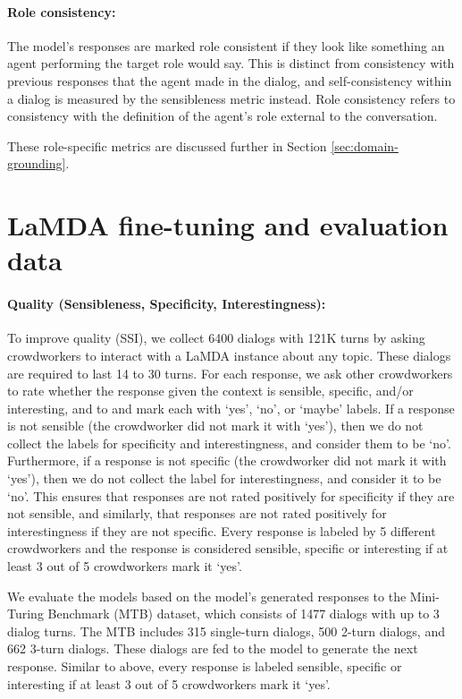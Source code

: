 \paragraph{Role consistency:} The model’s responses are marked role consistent if they look like something an agent performing the target role would say. This is distinct from consistency with previous responses that the agent made in the dialog, and self-consistency within a dialog is measured by the sensibleness metric instead. Role consistency refers to consistency with the definition of the agent’s role external to the conversation.

These role-specific metrics are discussed further in Section \ref{sec:domain-grounding}.

\section{LaMDA fine-tuning and evaluation data}
\label{sec:data}

\paragraph{Quality (Sensibleness, Specificity, Interestingness):} To improve quality (SSI), we collect 6400 dialogs with 121K turns by asking crowdworkers to interact with a LaMDA instance about any topic. These dialogs are required to last 14 to 30 turns. For each response, we ask other crowdworkers to rate whether the response given the context is sensible, specific, and/or interesting, and to and mark each with ‘yes’, ‘no’, or ‘maybe’ labels. If a response is not sensible (the crowdworker did not mark it with ‘yes’), then we do not collect the labels for specificity and interestingness, and consider them to be ‘no’. Furthermore, if a response is not specific (the crowdworker did not mark it with ‘yes’), then we do not collect the label for interestingness, and consider it to be ‘no’. This ensures that responses are not rated positively for specificity if they are not sensible, and similarly, that responses are not rated positively for interestingness if they are not specific. Every response is labeled by 5 different crowdworkers and the response is considered sensible, specific or interesting if at least 3 out of 5 crowdworkers mark it ‘yes’.

We evaluate the models based on the model’s generated responses to the Mini-Turing Benchmark (MTB) dataset\cite{adiwardana2020humanlike}, which consists of 1477 dialogs with up to 3 dialog turns. The MTB includes 315 single-turn dialogs, 500 2-turn dialogs, and 662 3-turn dialogs. These dialogs are fed to the model to generate the next response. Similar to above, every response is labeled sensible, specific or interesting if at least 3 out of 5 crowdworkers mark it ‘yes’.

